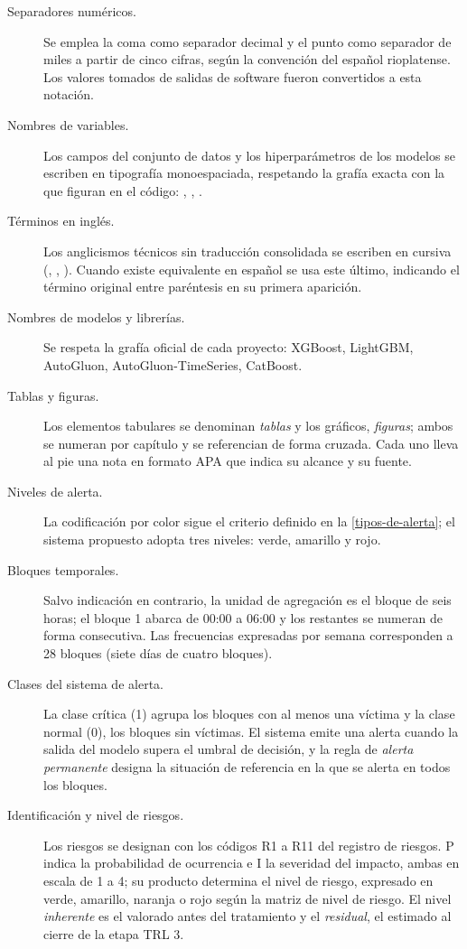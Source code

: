 \begin{description}
  \item[Separadores numéricos.] Se emplea la coma como separador decimal y el
    punto como separador de miles a partir de cinco cifras, según la convención
    del español rioplatense. Los valores tomados de salidas de software fueron
    convertidos a esta notación.
  \item[Nombres de variables.] Los campos del conjunto de datos y los
    hiperparámetros de los modelos se escriben en tipografía monoespaciada,
    respetando la grafía exacta con la que figuran en el código:
    , , .
  \item[Términos en inglés.] Los anglicismos técnicos sin traducción consolidada
    se escriben en cursiva (, , ).
    Cuando existe equivalente en español se usa este último, indicando el
    término original entre paréntesis en su primera aparición.
  \item[Nombres de modelos y librerías.] Se respeta la grafía oficial de cada
    proyecto: XGBoost, LightGBM, AutoGluon, AutoGluon-TimeSeries, CatBoost.
  \item[Tablas y figuras.] Los elementos tabulares se denominan \emph{tablas} y
    los gráficos, \emph{figuras}; ambos se numeran por capítulo y se referencian
    de forma cruzada. Cada uno lleva al pie una nota en formato APA que indica
    su alcance y su fuente.
  \item[Niveles de alerta.] La codificación por color sigue el criterio definido
    en la \cref{tipos-de-alerta}; el sistema propuesto adopta tres niveles:
    verde, amarillo y rojo.
  \item[Bloques temporales.] Salvo indicación en contrario, la unidad de
    agregación es el bloque de seis horas; el bloque 1 abarca de 00:00 a 06:00 y
    los restantes se numeran de forma consecutiva. Las frecuencias expresadas
    por semana corresponden a 28 bloques (siete días de cuatro bloques).
  \item[Clases del sistema de alerta.] La clase crítica (1) agrupa los bloques
    con al menos una víctima y la clase normal (0), los bloques sin víctimas. El
    sistema emite una alerta cuando la salida del modelo supera el umbral de
    decisión, y la regla de \emph{alerta permanente} designa la situación de
    referencia en la que se alerta en todos los bloques.
  \item[Identificación y nivel de riesgos.] Los riesgos se designan con los
    códigos R1 a R11 del registro de riesgos. P indica la probabilidad de
    ocurrencia e I la severidad del impacto, ambas en escala de 1 a 4; su
    producto determina el nivel de riesgo, expresado en verde, amarillo, naranja
    o rojo según la matriz de nivel de riesgo. El nivel \emph{inherente} es el
    valorado antes del tratamiento y el \emph{residual}, el estimado al cierre de
    la etapa TRL 3.
\end{description}
